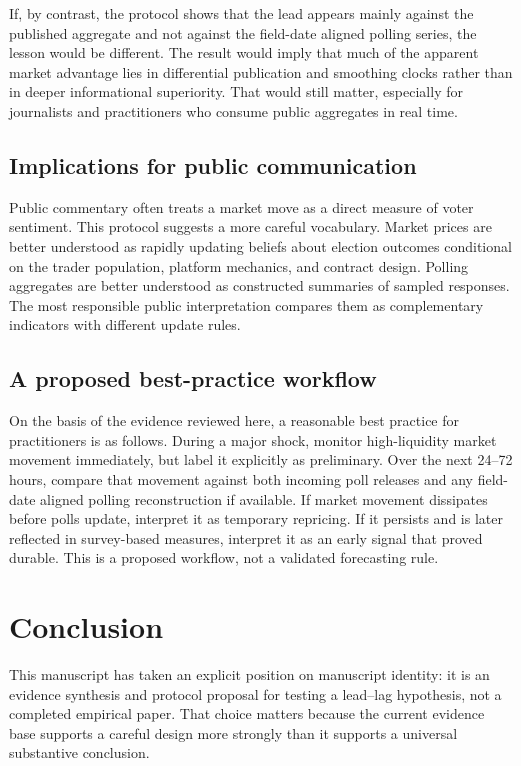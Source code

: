 \documentclass[11pt]{article}
\begin{document}
If, by contrast, the protocol shows that the lead appears mainly against the published aggregate and not against the field-date aligned polling series, the lesson would be different. The result would imply that much of the apparent market advantage lies in differential publication and smoothing clocks rather than in deeper informational superiority. That would still matter, especially for journalists and practitioners who consume public aggregates in real time.

\subsection{Implications for public communication}
Public commentary often treats a market move as a direct measure of voter sentiment. This protocol suggests a more careful vocabulary. Market prices are better understood as rapidly updating beliefs about election outcomes conditional on the trader population, platform mechanics, and contract design. Polling aggregates are better understood as constructed summaries of sampled responses. The most responsible public interpretation compares them as complementary indicators with different update rules.

\subsection{A proposed best-practice workflow}
On the basis of the evidence reviewed here, a reasonable best practice for practitioners is as follows. During a major shock, monitor high-liquidity market movement immediately, but label it explicitly as preliminary. Over the next 24--72 hours, compare that movement against both incoming poll releases and any field-date aligned polling reconstruction if available. If market movement dissipates before polls update, interpret it as temporary repricing. If it persists and is later reflected in survey-based measures, interpret it as an early signal that proved durable. This is a proposed workflow, not a validated forecasting rule.

\section{Conclusion}
This manuscript has taken an explicit position on manuscript identity: it is an evidence synthesis and protocol proposal for testing a lead--lag hypothesis, not a completed empirical paper. That choice matters because the current evidence base supports a careful design more strongly than it supports a universal substantive conclusion.
\end{document}
